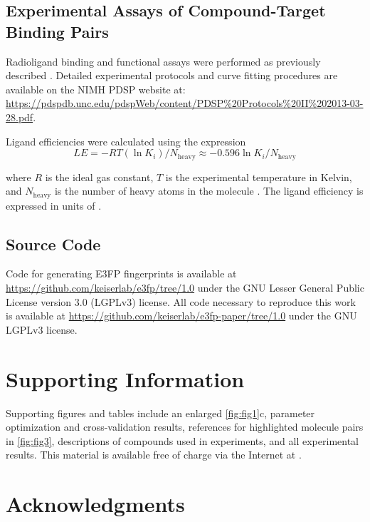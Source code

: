\documentclass[../../main.tex]{subfiles}
\begin{document}
\begin{refsection}
	\subsection*{Experimental Assays of Compound-Target Binding Pairs}

	Radioligand binding and functional assays were performed as previously described \supercite{barnea_2008,xiao_1998,xiao_2006}.
	Detailed experimental protocols and curve fitting procedures are available on the NIMH PDSP website at: \url{https://pdspdb.unc.edu/pdspWeb/content/PDSP\%20Protocols\%20II\%202013-03-28.pdf}.

	Ligand efficiencies were calculated using the expression
	\begin{equation}
		LE = -R T (\ln K_i) / N_\textrm{heavy} \approx -0.596 \ln K_i / N_\textrm{heavy} \nonumber
	\end{equation}

	where $R$ is the ideal gas constant, $T$ is the experimental temperature in Kelvin, and $N_\textrm{heavy}$ is the number of heavy atoms in the molecule \supercite{kuntz_1999}.
	The ligand efficiency is expressed in units of \LEunit{}.

	\subsection*{Source Code}

	Code for generating E3FP fingerprints is available at  \url{https://github.com/keiserlab/e3fp/tree/1.0} under the GNU Lesser General Public License version 3.0 (LGPLv3) license.
	All code necessary to reproduce this work is available at  \url{https://github.com/keiserlab/e3fp-paper/tree/1.0} under the GNU LGPLv3 license.

	\clearpage %
	\section{Supporting Information}\label{sec:suppinf}

	Supporting figures and tables include an enlarged \cref{fig:fig1}c, parameter optimization and cross-validation results, references for highlighted molecule pairs in \cref{fig:fig3}, descriptions of compounds used in experiments, and all experimental results.
	This material is available free of charge via the Internet at .

	\section*{Acknowledgments}


\end{refsection}
\end{document}
